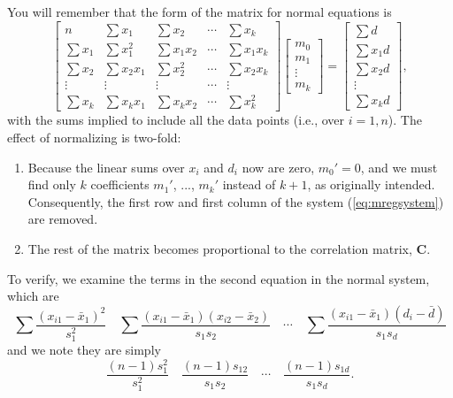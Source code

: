 You will remember that the form of the matrix for normal equations is
\begin{equation}
\left [ \begin{array}{ccccc}
n &  \sum x_1 &  \sum x_2 & \cdots &  \sum x_k \\[5pt]
 \sum x_1 &  \sum x^2_1 & \sum x_1 x_2 & \cdots &  \sum x_1 x_k \\[5pt]
 \sum x_2 &  \sum x_2 x_1 & \sum x^2_2 & \cdots &  \sum x_2 x_k \\[5pt]
\vdots & \vdots & \vdots & \cdots & \vdots \\[5pt]
 \sum x_k &  \sum x_k x_1  & \sum x_k x_2 & \cdots &  \sum x^2_k 
\end{array} \right ] 
\left [ \begin{array}{c}
m_0\\ m_1\\ \vdots \\ m_k \end{array} \right ]  = 
\left [
\begin{array}{c}
 \sum d \\[5pt]  \sum x_1 d \\[5pt]  \sum x_2 d \\[5pt] \vdots \\[5pt] \sum x_k d
\end{array} \right ] ,
\label{eq:mregsystem}
\end{equation}
with the sums implied to include all the data points (i.e., over $i = 1,n$).
The effect of normalizing is two-fold:
\begin{enumerate}
\item	Because the linear sums over $x_i$ and $d_i$ now are zero, $m_0' = 0$, and we must find only $k$ coefficients $m_1'$, ..., $m_k'$ instead of $k + 1$, as originally 
intended.  Consequently, the first row and first column of the system (\ref{eq:mregsystem}) are removed.
\item	The rest of the matrix becomes proportional to the correlation matrix, $\mathbf{C}$.
\end{enumerate}
To verify, we examine the terms in the second equation in the normal system, which are
\begin{equation}
\sum \frac{(x_{i1} - \bar{x}_1) ^2}{s^2_1} \quad \sum \frac{(x_{i1} - \bar{x}_1) (x_{i2} - \bar{x}_2)}{s_1s_2} \quad \cdots \quad \sum 
\frac{(x_{i1} - \bar{x}_1)(d_i - \bar{d})}{s_1s_d}
\end{equation}	 
and we note they are simply
\begin{equation}
\frac{(n-1)s^2_1}{s^2_1}  \quad \frac{(n-1)s_{12}}{s_1 s_2} \quad \cdots \quad \frac{(n-1)s_{1d}}{s_1 s_d}.
\end{equation}	 
